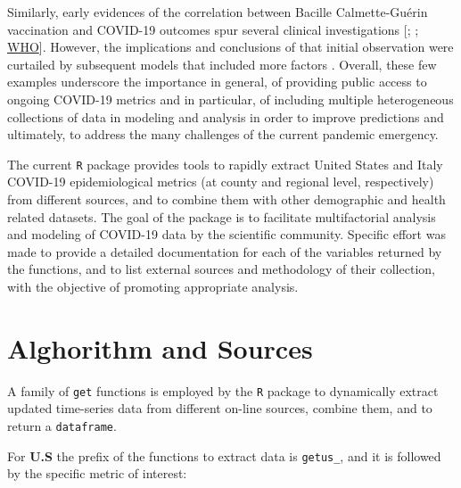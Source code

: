 \documentclass[12pt,halfline,a4paper,]{ouparticle}
\begin{document}
Similarly, early evidences of the correlation between Bacille
Calmette-Guérin vaccination and COVID-19 outcomes spur several clinical
investigations {[}\citet{miller2020m}; \citet{shet2020m};
\href{https://www.who.int/news-room/commentaries/detail/bacille-calmette-gu\%C3\%A9rin-(bcg)-vaccination-and-covid-19}{WHO}{]}.
However, the implications and conclusions of that initial observation
were curtailed by subsequent models that included more factors
\citep[e.s. age;][]{fukui2020m}. Overall, these few examples underscore
the importance in general, of providing public access to ongoing
COVID-19 metrics and in particular, of including multiple heterogeneous
collections of data in modeling and analysis in order to improve
predictions and ultimately, to address the many challenges of the
current pandemic emergency.

The current \texttt{R} package provides tools to rapidly extract United
States and Italy COVID-19 epidemiological metrics (at county and
regional level, respectively) from different sources, and to combine
them with other demographic and health related datasets. The goal of the
package is to facilitate multifactorial analysis and modeling of
COVID-19 data by the scientific community. Specific effort was made to
provide a detailed documentation for each of the variables returned by
the functions, and to list external sources and methodology of their
collection, with the objective of promoting appropriate analysis.

\hypertarget{alghorithm-and-sources}{%
\section{Alghorithm and Sources}\label{alghorithm-and-sources}}

A family of \texttt{get} functions is employed by the \texttt{R} package
to dynamically extract updated time-series data from different on-line
sources, combine them, and to return a \texttt{dataframe}.

For \textbf{U.S} the prefix of the functions to extract data is
\texttt{getus\_}, and it is followed by the specific metric of interest:
\end{document}
